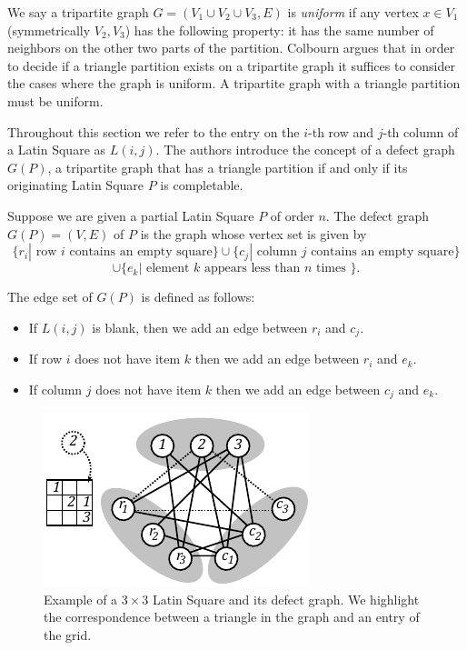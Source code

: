 \documentclass[runningheads,a4paper]{llncs}
\begin{document}
We say a tripartite graph $G = (V_1 \cup V_2 \cup V_3, E)$ is \emph{uniform} if any vertex $x \in V_1$ (symmetrically $V_2, V_3$) has the following property: it has the same number of neighbors on the other two parts of the partition.  Colbourn \cite{colbourn1984complexity} argues that in order to decide if a triangle partition exists on a tripartite graph it suffices to consider the cases where the graph is uniform. A tripartite graph with a triangle partition must be uniform. 

Throughout this section we refer to the entry on the $i$-th row and $j$-th column of a Latin Square as $L(i,j)$. The authors introduce the concept of a defect graph $G(P)$, a tripartite graph that has a triangle partition if and only if its originating Latin Square $P$ is completable. 

\begin{definition}
Suppose we are given a partial Latin Square $P$ of order $n$. The defect graph $G(P) = (V,E)$ of $P$ is the graph whose vertex set is given by $$\{ r_i | \text{ row } i \text{ contains an empty square} \} \cup \{ c_j | \text{ column } j \text{ contains an empty square} \} $$
$$ \cup \{ e_k | \text{ element } k\text{ appears less than } n \text{ times } \} .$$ 

The edge set of $G(P)$ is defined as follows: 

\begin{itemize}
	\item If $L(i,j)$ is blank, then we add an edge between $r_i$ and $c_j$. 
	\item If row $i$ does not have item $k$ then we add an edge between $r_i$ and $e_k$. 
	\item If column $j$ does not have item $k$ then we add an edge between $c_j$ and $e_k$.
\end{itemize}
\end{definition}

\begin{figure}
\centering
\label{fig:LStoTrianglePartitionExample}
\includegraphics[width=0.5\linewidth]{latinsquare_to_triangle_part_2.pdf}
\caption{Example of a $3\times 3$ Latin Square and its defect graph. We highlight the correspondence between a triangle in the graph and an entry of the grid.}
\end{figure}
\end{document}

